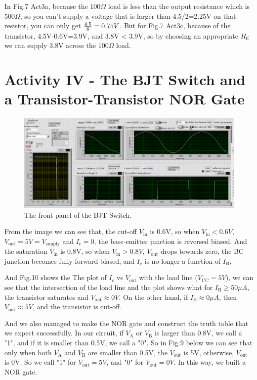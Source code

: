 \documentclass[11pt]{article}
\begin{document}
In Fig.7 Act3a, because the $100 \Omega$ load is less than the output resistance which is $500 \Omega$, so you can't supply a voltage that is larger than 4.5/2=2.25V on that resistor, you can only get ${4.5 \over 6}=0.75V$. But for Fig.7 Act3c, because of the transistor, 4.5V-0.6V=3.9V, and 3.8V < 3.9V, so by choosing an appropriate $R_{\mathrm{E}}$ we can supply 3.8V across the $100 \Omega$ load.

\section{Activity IV - The BJT Switch and a Transistor-Transistor NOR Gate}

\begin{figure}[H]
 \begin{center}
  \includegraphics[width=\linewidth/1]{act4}
  \caption{The front panel of the BJT Switch.}
  \label{fig:act4}
 \end{center}
\end{figure}

From the image we can see that, the cut-off $V_{\mathrm{in}}$ is 0.6V, so when $V_{\mathrm{in}}<0.6V$, $V_{\mathrm{out}}=5V=V_{\mathrm{supply}}$ and $I_{\mathrm{c}}=0$, the base-emitter junction is reversed biased. And the saturation $V_{\mathrm{in}}$ is 0.8V, so when $V_{\mathrm{in}}>0.8V$, $V_{\mathrm{out}}$ drops towards zero, the BC junction becomes fully forward biased, and $I_{\mathrm{c}}$ is no longer a function of $I_{\mathrm{B}}$. 

And Fig.10 shows the The plot of $I_{\mathrm{c}}$ vs $V_{\mathrm{out}}$ with the load line ($V_{\mathrm{CC}}=5V$), we can see that the intersection of the load line and the plot shows what for $I_{\mathrm{B}} \geq 50 \mu A$, the transistor 
saturates and $V_{\mathrm{out}} \approx 0V$. On the other hand, if $I_{\mathrm{B}} \approx 0 \mu A$, then $V_{\mathrm{out}} \approx 5V$, and the transistor is cut-off.

And we also managed to make the NOR gate and construct the truth table that we expect successfully. In our circuit, if $V_{\mathrm{A}}$ or $V_{\mathrm{B}}$ is larger than 0.8V, we call a "1", and if it is smaller than 0.5V, we call a "0". So in Fig.9 below we can see that only when both $V_{\mathrm{A}}$ and $V_{\mathrm{B}}$ are smaller than 0.5V, the $V_{\mathrm{out}}$ is 5V, otherwise, $V_{\mathrm{out}}$ is 0V. So we call "1" for $V_{\mathrm{out}}=5V$, and "0" for $V_{\mathrm{out}}=0V$. In this way, we built a NOR gate.
\end{document}
